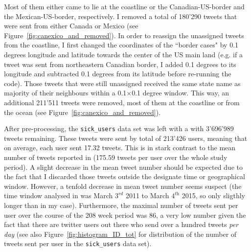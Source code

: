 \documentclass[11pt, a4paper,twoside]{report}\usepackage[]{graphicx}\usepackage[]{color}
\begin{document}
Most of them either came to lie at the coastline or the Canadian-US-border and the Mexican-US-border, respectively. I removed a total of 180'290 tweets that were sent from either Canada or Mexico (see Figure~\ref{fig:canexico_and_removed}). In order to reassign the unassigned tweets from the coastline, I first changed the coordinates of the ``border cases" by 0.1 degrees longitude and latitude towards the center of the US main land (e.g. if a tweet was sent from northeastern Canadian border, I added 0.1 degrees to its longitude and subtracted 0.1 degrees from its latitude before re-running the code). Those tweets that were still unassigned received the same state name as majority of their neighbours within a 0.1$\times$0.1 degree window. This way, an additional 211'511 tweets were removed, most of them at the coastline or from the ocean (see Figure~\ref{fig:canexico_and_removed}).

After pre-processing, the \texttt{sick\_users} data set was left with a with 3'696'989 tweets remaining. These tweets were sent by total of 213'426 users, meaning that on average, each user sent 17.32 tweets. This is in stark contrast to the mean number of tweets reported in \cite{bodnar_data_2015} (175.59 tweets per user over the whole study period). A slight decrease in the mean tweet number should be expected due to the fact that I discarded those tweets outside the designate time or geographical window. However, a tenfold decrease in mean tweet number seems suspect (the time window analysed in \cite{bodnar_data_2015} was March $3^\textit{rd}$ 2011 to March $4^\textit{th}$ 2015, so only sligthly longer than in my case). Furthermore, the maximal number of tweets sent per user over the course of the 208 week period was 86, a very low number given the fact that there are twitter users out there who send over a hundred tweets \textit{per day} (see also Figure~\ref{fig:histogram_ID_tot} for distribution of the number of tweets sent per user in the \texttt{sick\_users} data set).\newpage
\end{document}
